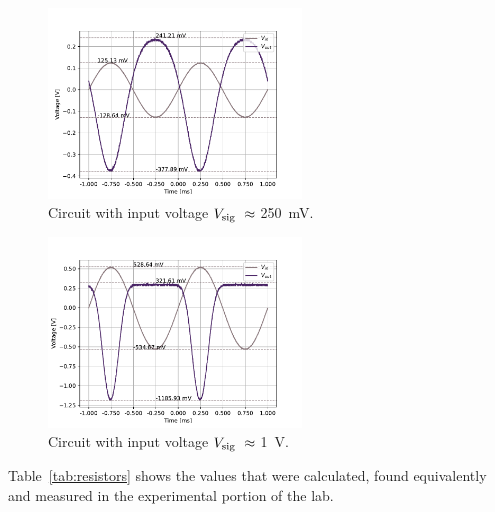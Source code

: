 \documentclass{../../ece-report}
\begin{document}
\begin{figure}[h!]
  \centering
  \includegraphics[width=0.6\textwidth]{../plots/pdf/vi_250m.pdf}
  \caption{Circuit with input voltage $V_\textnormal{sig} ~\approx$ 250~\si{\mV}.}\label{fig:250m}
\end{figure}

\begin{figure}[h!]
  \centering
  \includegraphics[width=0.6\textwidth]{../plots/pdf/vi_1v.pdf}
  \caption{Circuit with input voltage $V_\textnormal{sig} ~\approx$ 1~\si{\V}.}\label{fig:1V}
\end{figure}




Table~\ref{tab:resistors} shows the values that were
calculated, found equivalently and measured in the experimental
portion of the lab.
\end{document}
